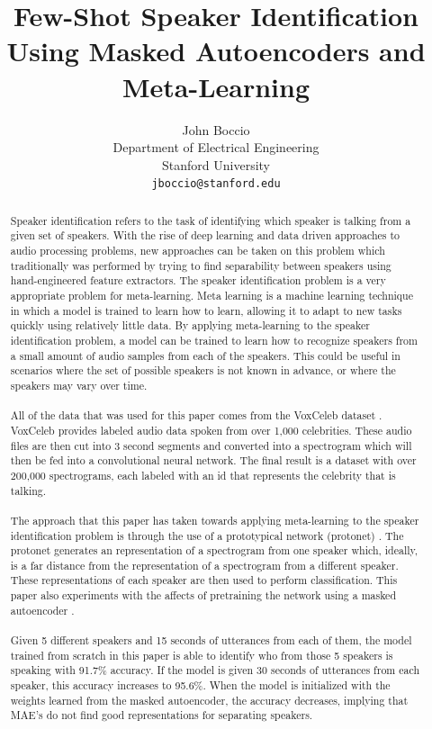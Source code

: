\documentclass{article}
\title{Few-Shot Speaker Identification Using Masked Autoencoders and Meta-Learning}
\author{
  John Boccio \\
  Department of Electrical Engineering\\
  Stanford University\\
  \texttt{jboccio@stanford.edu} \\
}
\begin{document}
\maketitle

\begin{abstract}
Speaker identification refers to the task of identifying which speaker is talking from a given set of 
speakers. With the rise of deep learning and data driven approaches to audio processing problems, new approaches can be
taken on this problem which traditionally was performed by trying to find separability between
speakers using hand-engineered feature extractors. The speaker identification problem is a very appropriate problem for meta-learning. 
Meta learning is a machine learning technique in which a model is trained to learn how to learn, allowing it to 
adapt to new tasks quickly using relatively little data. By applying meta-learning to the speaker identification problem, 
a model can be trained to learn how to recognize speakers from a small amount of audio samples from each of the speakers. 
This could be useful in scenarios where the set of possible speakers is not known in advance, or where the speakers may vary over time.
\\
\\
All of the data that was used for this paper comes from the VoxCeleb dataset \cite{DBLP:journals/corr/NagraniCZ17}. VoxCeleb
provides labeled audio data spoken from over 1,000 celebrities. These audio files are then cut into 3 second segments and 
converted into a spectrogram which will then be fed into a convolutional neural network. The final
result is a dataset with over 200,000 spectrograms, each labeled with an id that represents the celebrity that is talking.
\\
\\
The approach that this paper has taken towards applying meta-learning to the speaker identification problem is through the 
use of a prototypical network (protonet) \cite{DBLP:journals/corr/SnellSZ17}. The protonet generates an representation of a
spectrogram from one speaker which, ideally, is a far distance from the representation of a spectrogram from a different
speaker. These representations of each speaker are then used to perform classification. This paper also experiments with 
the affects of pretraining the network using a masked autoencoder \cite{DBLP:journals/corr/abs-2111-06377}.
\\
\\
Given 5 different speakers and 15 seconds of utterances from each of them, the model trained from scratch in this paper 
is able to identify who from those 5 speakers is speaking with 91.7\% accuracy. If the model is given 30 seconds of utterances
from each speaker, this accuracy increases to 95.6\%. When the model is initialized with the weights learned from the 
masked autoencoder, the accuracy decreases, implying that MAE's do not find good representations for separating speakers.

\end{abstract}
\end{document}
